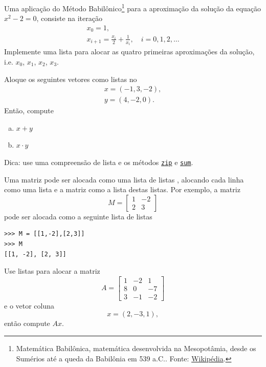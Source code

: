 \documentclass[12pt]{article}
\begin{document}
\begin{exr}
  Uma aplicação do Método Babilônico\footnote{Matemática Babilônica, matemática desenvolvida na Mesopotâmia, desde os Sumérios até a queda da Babilônia em 539 a.C.. Fonte: \href{https://pt.wikipedia.org/wiki/Matem\%C3\%A1tica\_babil\%C3\%B4nica}{Wikipédia}.} para a aproximação da solução da equação $x^2-2 = 0$, consiste na iteração
  \begin{gather}
    x_0 = 1,\\
    x_{i+1} = \frac{x_i}{2} + \frac{1}{x_i},\quad i=0,1,2,\ldots
  \end{gather}
  Implemente uma lista para alocar as quatro primeiras aproximações da solução, i.e. $x_0$, $x_1$, $x_2$, $x_3$.
\end{exr}

\begin{exr}
  Aloque os seguintes vetores como listas no {\python}
  \begin{gather}
    x = (-1, 3, -2),\\
    y = (4, -2, 0).
  \end{gather}
  Então, compute
  \begin{enumerate}[a)]
  \item $x+y$
  \item $x\cdot y$
  \end{enumerate}
  Dica: use uma compreensão de lista e os métodos {\python} \href{https://docs.python.org/3/library/functions.html#zip}{\lstinline+zip+} e \href{https://docs.python.org/3/library/functions.html?highlight=sum#sum}{\lstinline+sum+}.
\end{exr}

\begin{exr}
  Uma matriz pode ser alocada como uma lista de listas {\python}, alocando cada linha como uma lista e a matriz como a lista destas listas. Por exemplo, a matriz
  \begin{equation}
    M =
    \begin{bmatrix}
      1 & -2 \\
      2 & 3
    \end{bmatrix}
  \end{equation}
  pode ser alocada como a seguinte lista de listas

\begin{lstlisting}
>>> M = [[1,-2],[2,3]]
>>> M
[[1, -2], [2, 3]]
\end{lstlisting}

  Use listas para alocar a matriz
  \begin{equation}
    A =
    \begin{bmatrix}
      1 & -2 & 1\\
      8 & 0 & -7\\
      3 & -1 & -2
    \end{bmatrix}
  \end{equation}
  e o vetor coluna
  \begin{equation}
    x = (2, -3, 1),
  \end{equation}
  então compute $Ax$.
\end{exr}
\end{document}
